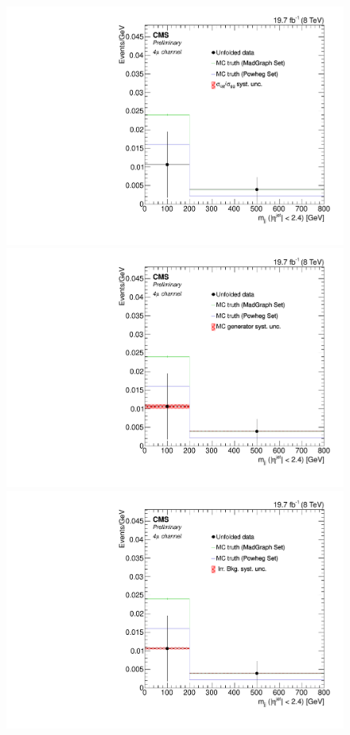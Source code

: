 \begin{figure}[hbtp]
  \begin{center}
    \includegraphics[width=0.8\cmsFigWidth]{Figures/Unfolding/Systematics/ZZTo4m_CentralMjj_qqgg_Mad_fr}     
    \includegraphics[width=0.8\cmsFigWidth]{Figures/Unfolding/Systematics/ZZTo4m_CentralMjj_MCgen_Mad_fr}     
    \includegraphics[width=0.8\cmsFigWidth]{Figures/Unfolding/Systematics/ZZTo4m_CentralMjj_IrrBkg_Mad_fr}

\end{center}
\end{figure}
